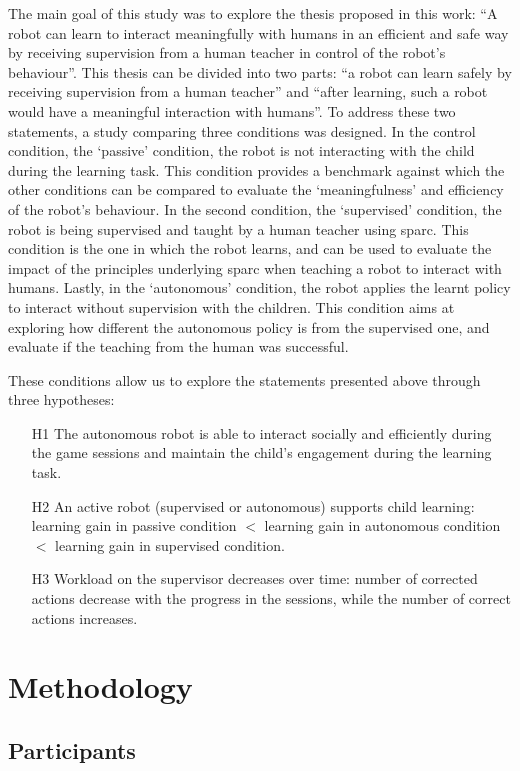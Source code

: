 The main goal of this study was to explore the thesis proposed in this work: ``A robot can learn to interact meaningfully with humans in an efficient and safe way by receiving supervision from a human teacher in control of the robot's behaviour''. This thesis can be divided into two parts: ``a robot can learn safely by receiving supervision from a human teacher'' and ``after learning, such a robot would have a meaningful interaction with humans''. To address these two statements, a study comparing three conditions was designed. In the control condition, the `passive' condition, the robot is not interacting with the child during the learning task. This condition provides a benchmark against which the other conditions can be compared to evaluate the `meaningfulness' and efficiency of the robot's behaviour. In the second condition, the `supervised' condition, the robot is being supervised and taught by a human teacher using \gls{sparc}. This condition is the one in which the robot learns, and can be used to evaluate the impact of the principles underlying \gls{sparc} when teaching a robot to interact with humans. Lastly, in the `autonomous' condition, the robot applies the learnt policy to interact without supervision with the children. This condition aims at exploring how different the autonomous policy is from the supervised one, and evaluate if the teaching from the human was successful.

These conditions allow us to explore the statements presented above through three hypotheses:
\begin{itemize}
	\item [H1] The autonomous robot is able to interact socially and efficiently during the game sessions and maintain the child's engagement during the learning task.
	\item [H2] An active robot (supervised or autonomous) supports child learning: learning gain in passive condition $<$ learning gain in autonomous condition $<$ learning gain in supervised condition.
	\item [H3] Workload on the supervisor decreases over time: number of corrected actions decrease with the progress in the sessions, while the number of correct actions increases.
\end{itemize}

\section{Methodology}

\subsection{Participants}

